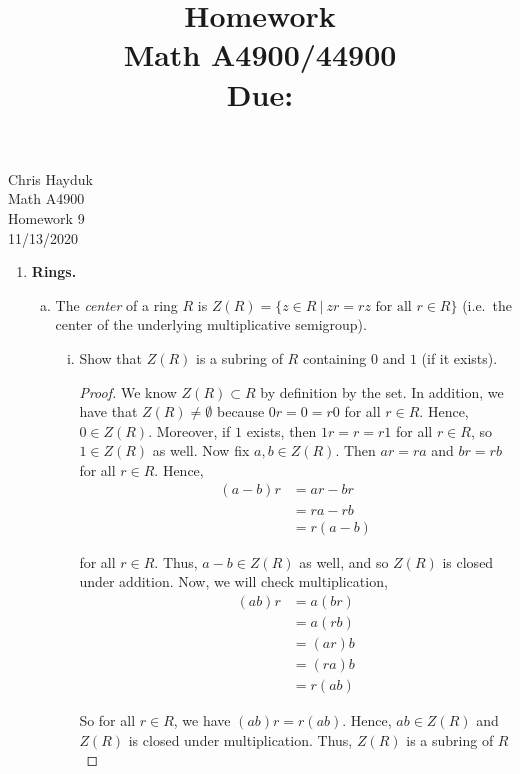 \documentclass[11pt, reqno]{amsart}
\title[Homework \HW]{Homework \HW \\
Math A4900/44900\\
\small Due: \DUE}
\author{}
\theoremstyle{plain}
\theoremstyle{definition}
\theoremstyle{example}
\def\HW{9}
\def\DUE{11/13/2020}
\begin{document}
\begin{flushright}
Chris Hayduk\\
Math A4900\\
Homework \HW\\
\DUE
\end{flushright}





\begin{enumerate}[1.]
\item {\bf Rings.}
\begin{enumerate}[(a)]
\item The \emph{center} of a ring $R$ is $Z(R) = \{z \in R ~|~ zr = rz \text{ for all } r \in R\}$ (i.e.\ the center of the underlying multiplicative semigroup).
\begin{enumerate}[(i)]
\item Show that $Z(R)$ is a subring of $R$ containing $0$ and $1$ (if it exists).

\begin{proof}
We know $Z(R) \subset R$ by definition by the set. In addition, we have that $Z(R) \neq \emptyset$ because $0r = 0 = r0$ for all $r \in R$. Hence, $0 \in Z(R)$. Moreover, if $1$ exists, then $1r = r = r1$ for all $r \in R$, so $1 \in Z(R)$ as well. Now fix $a, b \in Z(R)$. Then $ar = ra$ and $br = rb$ for all $r \in R$. Hence,
\begin{align*}
(a-b)r &= ar - br\\
&= ra - rb\\
&= r(a - b)
\end{align*}

for all $r \in R$. Thus, $a - b \in Z(R)$ as well, and so $Z(R)$ is closed under addition. Now, we will check multiplication,
\begin{align*}
(ab)r &= a(br)\\
&= a(rb)\\
&= (ar)b\\
&= (ra)b\\
&= r(ab)
\end{align*}

So for all $r \in R$, we have $(ab)r = r(ab)$. Hence, $ab \in Z(R)$ and $Z(R)$ is closed under multiplication. Thus, $Z(R)$ is a subring of $R$
\end{proof}


\end{enumerate}
\end{enumerate}
\end{enumerate}
\end{document}
